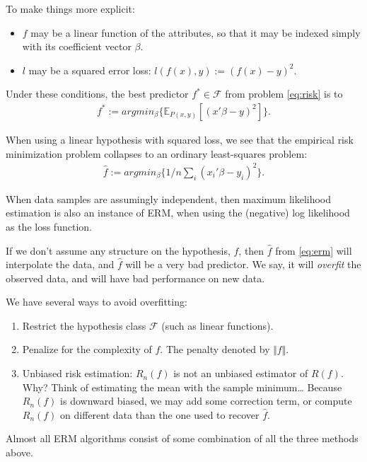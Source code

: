 \documentclass[]{book}
\providecommand{\tightlist}{%
  \setlength{\itemsep}{0pt}\setlength{\parskip}{0pt}}
\theoremstyle{definition}
\theoremstyle{definition}
\theoremstyle{definition}
\theoremstyle{remark}
\begin{document}
To make things more explicit:

\begin{itemize}
\tightlist
\item
  \(f\) may be a linear function of the attributes, so that it may be indexed simply with its coefficient vector \(\beta\).
\item
  \(l\) may be a squared error loss: \(l(f(x),y):=(f(x)-y)^2\).
\end{itemize}

Under these conditions, the best predictor \(f^* \in \mathcal{F}\) from problem \eqref{eq:risk} is to
\begin{align}
  f^* := argmin_\beta \{ \mathbb{E}_{P(x,y)}[(x'\beta-y)^2] \}.
\end{align}

When using a linear hypothesis with squared loss, we see that the empirical risk minimization problem collapses to an ordinary least-squares problem:
\begin{align}
  \hat f := argmin_\beta \{1/n \sum_i (x_i'\beta - y_i)^2 \}.
\end{align}

When data samples are assumingly independent, then maximum likelihood estimation is also an instance of ERM, when using the (negative) log likelihood as the loss function.

If we don't assume any structure on the hypothesis, \(f\), then \(\hat f\) from \eqref{eq:erm} will interpolate the data, and \(\hat f\) will be a very bad predictor.
We say, it will \emph{overfit} the observed data, and will have bad performance on new data.

We have several ways to avoid overfitting:

\begin{enumerate}
\def\labelenumi{\arabic{enumi}.}
\tightlist
\item
  Restrict the hypothesis class \(\mathcal{F}\) (such as linear functions).
\item
  Penalize for the complexity of \(f\). The penalty denoted by \(\Vert f \Vert\).
\item
  Unbiased risk estimation:
  \(R_n(f)\) is not an unbiased estimator of \(R(f)\).
  Why? Think of estimating the mean with the sample minimum\ldots{}
  Because \(R_n(f)\) is downward biased, we may add some correction term, or compute \(R_n(f)\) on different data than the one used to recover \(\hat f\).
\end{enumerate}

Almost all ERM algorithms consist of some combination of all the three methods above.
\end{document}
